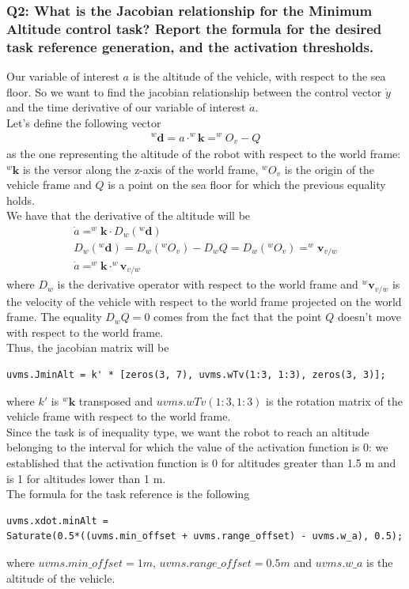 \documentclass{article}
\begin{document}
\subsubsection{Q2: What is the Jacobian relationship for the Minimum Altitude control task? Report the formula for the desired task reference generation, and the activation thresholds.}
Our variable of interest $ a $ is the altitude of the vehicle, with respect to the sea floor. So we want to find the jacobian relationship between the control vector $ \dot{y} $ and the time derivative of our variable of interest $ \dot{a} $. \\
Let's define the following vector
\begin{gather*}
	^{w}\boldsymbol{d} = a \cdot ^{w}\boldsymbol{k} = ^{w}O_{v} - Q
\end{gather*}
as the one representing the altitude of the robot with respect to the world frame:$ ^{w}\boldsymbol{k} $ is the versor along the z-axis of the world frame, $ ^{w}O_{v} $ is the origin of the vehicle frame and $ Q $ is a point on the sea floor for which the previous equality holds. \\
We have that the derivative of the altitude will be
\begin{gather*}
	\dot{a} = ^{w}\boldsymbol{k} \cdot D_{w}(^{w}\boldsymbol{d}) \\
	D_{w}(^{w}\boldsymbol{d}) = D_{w}(^{w}O_{v}) - D_{w}Q = D_{w}(^{w}O_{v}) = ^{w}\boldsymbol{v}_{v/w} \\
	\dot{a} = ^{w}\boldsymbol{k} \cdot ^{w}\boldsymbol{v}_{v/w}
\end{gather*}
where $ D_{w} $ is the derivative operator with respect to the world frame and $ ^{w}\boldsymbol{v}_{v/w} $ is the velocity of the vehicle with respect to the world frame projected on the world frame. The equality $ D_{w}Q = 0 $ comes from the fact that the point $ Q $ doesn't move with respect to the world frame. \\
Thus, the jacobian matrix will be
\begin{lstlisting}
uvms.JminAlt = k' * [zeros(3, 7), uvms.wTv(1:3, 1:3), zeros(3, 3)];
\end{lstlisting}
where $ k' $ is $ ^{w}\boldsymbol{k} $ transposed and $ uvms.wTv(1:3, 1:3) $ is the rotation matrix of the vehicle frame with respect to the world frame. \\
Since the task is of inequality type, we want the robot to reach an altitude belonging to the interval for which the value of the activation function is 0: we established that the activation function is 0 for altitudes greater than 1.5 m and is 1 for altitudes lower than 1 m. \\
The formula for the task reference is the following
\begin{lstlisting}
uvms.xdot.minAlt = 
Saturate(0.5*((uvms.min_offset + uvms.range_offset) - uvms.w_a), 0.5);
\end{lstlisting}
where $ uvms.min\_offset = 1 m $, $ uvms.range\_offset = 0.5 m $ and $ uvms.w\_a $ is the altitude of the vehicle.
\end{document}
